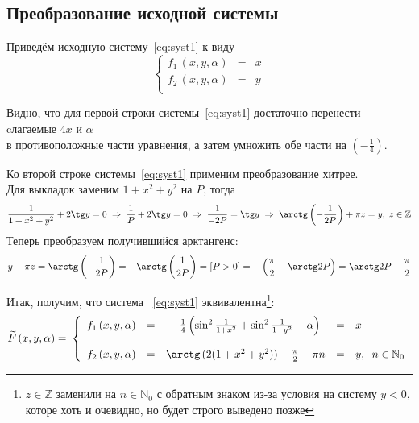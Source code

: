 \documentclass[a4paper,12pt]{article}
\begin{document}
\subsection{Преобразование исходной системы}

Приведём исходную систему~\eqref{eq:syst1} к виду
$$
    \left\{
        \begin{array}{ccc} 
            f_1\,(x, y, \alpha) & = & x \\ 
            f_2\,(x, y, \alpha) & = & y \\
        \end{array} 
    \right. 
$$

Видно, что для первой строки системы~\eqref{eq:syst1} 
достаточно перенести cлагаемые $4x$ и $\alpha$ \\
в противоположные части уравнения, а затем умножить обе части на $\left(-\frac14\right)$.
\par\medskip
Ко второй строке системы~\eqref{eq:syst1} применим преобразование хитрее.\\
Для выкладок заменим $ 1+x^2+y^2 $ на $P$, тогда 
$$
    \frac{1}{1+x^2+y^2} + 2 \tg y  = 0  \;\Rightarrow\;
    \frac1P + 2 \tg y  = 0              \;\Rightarrow\;
    \frac1{-2P} = \tg y                 \;\Rightarrow\; 
    \arctg\left(-\frac1{2P}\right) + \pi z = y,\;z \in \mathbb{Z}
$$
Теперь преобразуем получившийся арктангенс:
$$
    y -\pi z= \arctg\left(-\frac1{2P}\right) =    
    -\arctg\left(\frac1{2P}\right) =
    \left[ P > 0 \right] =
    -\left( \frac\pi2 - \arctg2P \right) = 
    \arctg2P - \frac\pi2 
$$

Итак, получим, что система ~\eqref{eq:syst1} эквивалентна\footnote{
$z \in \mathbb{Z}$ заменили на $n \in \mathbb{N}_0$ с обратным знаком из-за условия на систему  $y < 0$, которе хоть и очевидно, но будет строго выведено позже}:
\begin{equation}\label{eq:syst2}
    \text{$ \widetilde{F}\,(x, y, \alpha) = $ }
    \left\{
        \begin{array}{ccccl} 
            f_1\,(x, y, \alpha) & = & -\frac14 
            \left( \sin^2 \frac1{1+x^2} + \sin^2 \frac1{1+y^2} - \alpha \right)
            & = & x \\
            \\
            f_2\,(x, y, \alpha) & = & 
            \arctg\,(2(1+x^2+y^2)) - \frac\pi2 - \pi n& = & y,\;\;n \in \mathbb{N}_0\\
        \end{array} 
    \right. 
\end{equation}
\end{document}
